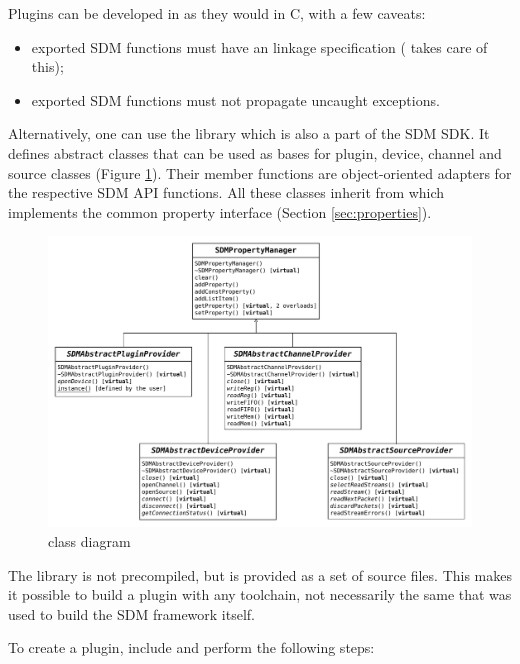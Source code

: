 \documentclass[a4paper,12pt,twoside,extrafontsizes]{memoir}
\begin{document}
Plugins can be developed in \cplusplus{} as they would in C, with a few caveats:

\begin{itemize}
	\item exported SDM functions must have an  linkage specification ( takes care of this);
	\item exported SDM functions must not propagate uncaught exceptions.
\end{itemize}

Alternatively, one can use the  library which is also a part of the SDM SDK. It defines abstract classes that can be used as bases for plugin, device, channel and source classes (Figure \ref{fig:pluginprovider}). Their member functions are object-oriented adapters for the respective SDM API functions. All these classes inherit from  which implements the common property interface (Section \ref{sec:properties}).

\begin{figure}[htbp]
\centering
\includegraphics[scale=0.75,angle=90]{images/pluginprovider.pdf}
\caption{ class diagram}
\label{fig:pluginprovider}
\end{figure}

The  library is not precompiled, but is provided as a set of source files. This makes it possible to build a plugin with any toolchain, not necessarily the same that was used to build the SDM framework itself.

To create a plugin, include  and perform the following steps:
\end{document}

